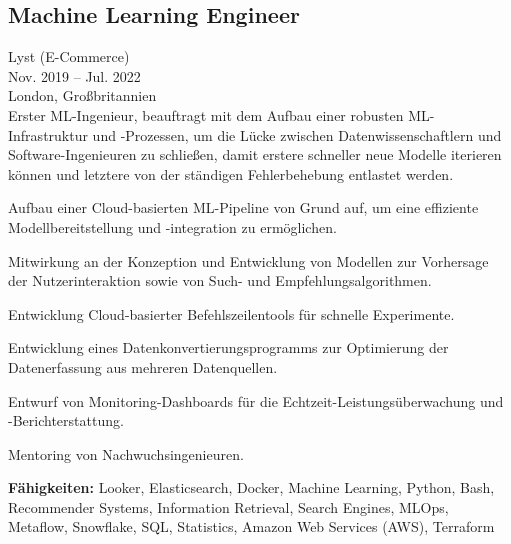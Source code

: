 \documentclass[a4paper,10pt]{article}
\begin{document}
\subsection*{Machine Learning Engineer}
Lyst (E-Commerce) \\
Nov. 2019 – Jul. 2022 \\
London, Großbritannien \\
Erster ML-Ingenieur, beauftragt mit dem Aufbau einer robusten ML-Infrastruktur und -Prozessen, um die Lücke zwischen Datenwissenschaftlern und Software-Ingenieuren zu schließen, damit erstere schneller neue Modelle iterieren können und letztere von der ständigen Fehlerbehebung entlastet werden.
\begin{bulletlist}
    \item Aufbau einer Cloud-basierten ML-Pipeline von Grund auf, um eine effiziente Modellbereitstellung und -integration zu ermöglichen.
    \item Mitwirkung an der Konzeption und Entwicklung von Modellen zur Vorhersage der Nutzerinteraktion sowie von Such- und Empfehlungsalgorithmen.
    \item Entwicklung Cloud-basierter Befehlszeilentools für schnelle Experimente.
    \item Entwicklung eines Datenkonvertierungsprogramms zur Optimierung der Datenerfassung aus mehreren Datenquellen.
    \item Entwurf von Monitoring-Dashboards für die Echtzeit-Leistungsüberwachung und -Berichterstattung.
    \item Mentoring von Nachwuchsingenieuren.
\end{bulletlist}
\textbf{Fähigkeiten:} Looker, Elasticsearch, Docker, Machine Learning, Python, Bash, Recommender Systems, Information Retrieval, Search Engines, MLOps, Metaflow, Snowflake, SQL, Statistics, Amazon Web Services (AWS), Terraform

\pagebreak
\end{document}
